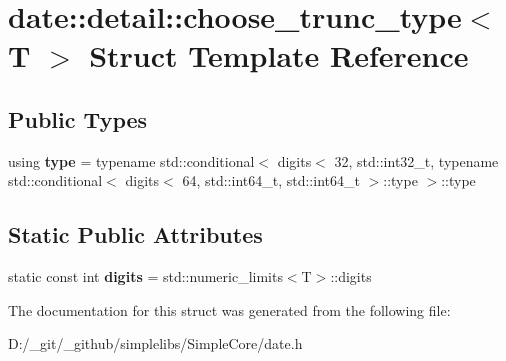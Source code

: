 \hypertarget{structdate_1_1detail_1_1choose__trunc__type}{}\section{date\+::detail\+::choose\+\_\+trunc\+\_\+type$<$ T $>$ Struct Template Reference}
\label{structdate_1_1detail_1_1choose__trunc__type}
\subsection*{Public Types}
\begin{DoxyCompactItemize}
\item 
\mbox{\label{structdate_1_1detail_1_1choose__trunc__type_ae143a42902d17cf643ed962787421fc9}} 
using {\bfseries type} = typename std\+::conditional$<$ digits$<$ 32, std\+::int32\+\_\+t, typename std\+::conditional$<$ digits$<$ 64, std\+::int64\+\_\+t, std\+::int64\+\_\+t $>$\+::type $>$\+::type
\end{DoxyCompactItemize}
\subsection*{Static Public Attributes}
\begin{DoxyCompactItemize}
\item 
\mbox{\label{structdate_1_1detail_1_1choose__trunc__type_a9f9a710c13a24da255120b935031171b}} 
static const int {\bfseries digits} = std\+::numeric\+\_\+limits$<$T$>$\+::digits
\end{DoxyCompactItemize}


The documentation for this struct was generated from the following file\+:\begin{DoxyCompactItemize}
\item 
D\+:/\+\_\+git/\+\_\+github/simplelibs/\+Simple\+Core/date.\+h\end{DoxyCompactItemize}
